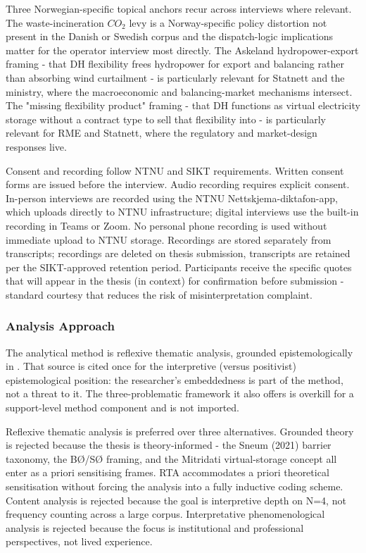 Three Norwegian-specific topical anchors recur across interviews where relevant. The waste-incineration $CO_2$ levy is a Norway-specific policy distortion not present in the Danish or Swedish corpus and the dispatch-logic implications matter for the operator interview most directly. The Askeland hydropower-export framing - that DH flexibility frees hydropower for export and balancing rather than absorbing wind curtailment - is particularly relevant for Statnett and the ministry, where the macroeconomic and balancing-market mechanisms intersect. The "missing flexibility product" framing - that DH functions as virtual electricity storage without a contract type to sell that flexibility into - is particularly relevant for RME and Statnett, where the regulatory and market-design responses live.

Consent and recording follow NTNU and SIKT requirements. Written consent forms are issued before the interview. Audio recording requires explicit consent. In-person interviews are recorded using the NTNU Nettskjema-diktafon-app, which uploads directly to NTNU infrastructure; digital interviews use the built-in recording in Teams or Zoom. No personal phone recording is used without immediate upload to NTNU storage. Recordings are stored separately from transcripts; recordings are deleted on thesis submission, transcripts are retained per the SIKT-approved retention period. Participants receive the specific quotes that will appear in the thesis (in context) for confirmation before submission - standard courtesy that reduces the risk of misinterpretation complaint.


\subsubsection{Analysis Approach}
\label{3-subsec:3.5.3 analysis approach}

The analytical method is reflexive thematic analysis, grounded epistemologically in \cite{cunliffe_crafting_2010}. That source is cited once for the interpretive (versus positivist) epistemological position: the researcher's embeddedness is part of the method, not a threat to it. The three-problematic framework it also offers is overkill for a support-level method component and is not imported.

Reflexive thematic analysis is preferred over three alternatives. Grounded theory is rejected because the thesis is theory-informed - the Sneum (2021) barrier taxonomy, the BØ/SØ framing, and the Mitridati virtual-storage concept all enter as a priori sensitising frames. RTA accommodates a priori theoretical sensitisation without forcing the analysis into a fully inductive coding scheme. Content analysis is rejected because the goal is interpretive depth on N=4, not frequency counting across a large corpus. Interpretative phenomenological analysis is rejected because the focus is institutional and professional perspectives, not lived experience.

